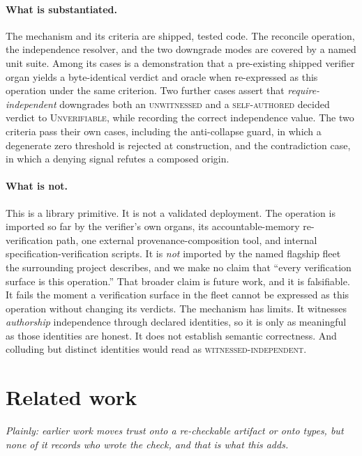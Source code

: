 \documentclass[11pt]{article}
\begin{document}
\paragraph{What is substantiated.} The mechanism and its criteria are shipped, tested code. The reconcile operation, the independence resolver, and the two downgrade modes are covered by a named unit suite. Among its cases is a demonstration that a pre-existing shipped verifier organ yields a byte-identical verdict and oracle when re-expressed as this operation under the same criterion. Two further cases assert that \emph{require-independent} downgrades both an \textsc{unwitnessed} and a \textsc{self-authored} decided verdict to \textsc{Unverifiable}, while recording the correct independence value. The two criteria pass their own cases, including the anti-collapse guard, in which a degenerate zero threshold is rejected at construction, and the contradiction case, in which a denying signal refutes a composed origin.

\paragraph{What is not.} This is a library primitive. It is not a validated deployment. The operation is imported so far by the verifier's own organs, its accountable-memory re-verification path, one external provenance-composition tool, and internal specification-verification scripts. It is \emph{not} imported by the named flagship fleet the surrounding project describes, and we make no claim that ``every verification surface is this operation.'' That broader claim is future work, and it is falsifiable. It fails the moment a verification surface in the fleet cannot be expressed as this operation without changing its verdicts. The mechanism has limits. It witnesses \emph{authorship} independence through declared identities, so it is only as meaningful as those identities are honest. It does not establish semantic correctness. And colluding but distinct identities would read as \textsc{witnessed-independent}.

\section{Related work}
\emph{Plainly: earlier work moves trust onto a re-checkable artifact or onto types, but none of it records who wrote the check, and that is what this adds.}
\end{document}
